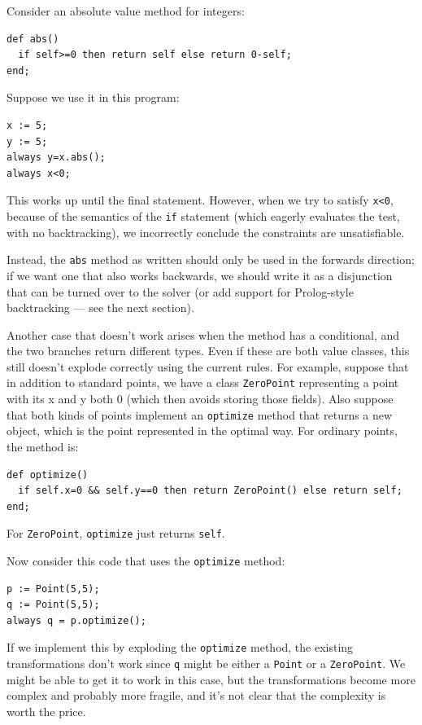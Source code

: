 \documentclass{article}
\begin{document}
Consider an absolute value method for integers:

\begin{verbatim}
def abs()
  if self>=0 then return self else return 0-self;
end;
\end{verbatim}

Suppose we use it in this program:

\begin{verbatim}
x := 5;
y := 5;
always y=x.abs();
always x<0;
\end{verbatim}

This works up until the final statement.  However, when we try to
satisfy \verb|x<0|, because of the semantics of the \verb|if|
statement (which eagerly evaluates the test, with no backtracking), we
incorrectly conclude the constraints are unsatisfiable.

Instead, the \verb|abs| method as written should only be used in the
forwards direction; if we want one that also works backwards, we
should write it as a disjunction that can be turned over to the
solver (or add support for Prolog-style backtracking --- see the next
section). 

Another case that doesn't work arises when the method has a
conditional, and the two branches return different types.  Even if
these are both value classes, this still doesn't explode correctly
using the current rules.  For example, suppose that in addition to
standard points, we have a class \verb|ZeroPoint| representing a point
with its x and y both 0 (which then avoids storing those fields).
Also suppose that both kinds of points implement an \verb|optimize|
method that returns a new object, which is the point represented in
the optimal way.  For ordinary points, the method is:

\begin{verbatim}
def optimize()
  if self.x=0 && self.y==0 then return ZeroPoint() else return self;
end;
\end{verbatim}

For \verb|ZeroPoint|, \verb|optimize| just returns \verb|self|.  

Now consider this code that uses the \verb|optimize| method:

\begin{verbatim}
p := Point(5,5);
q := Point(5,5);
always q = p.optimize();
\end{verbatim}

If we implement this by exploding the \verb|optimize| method, the
existing transformations don't work since \verb|q| might be either a
\verb|Point| or a \verb|ZeroPoint|.  We might be able to get it to
work in this case, but the transformations become more complex and
probably more fragile, and it's not clear that the complexity is worth
the price.
\end{document}
